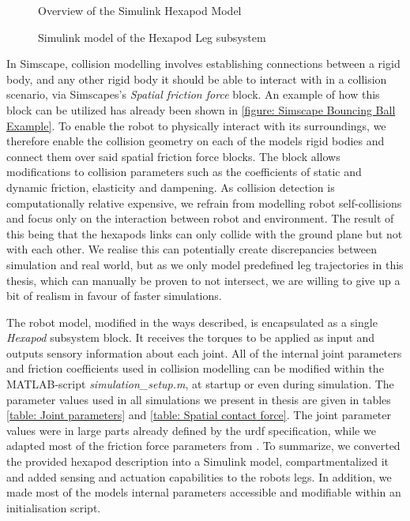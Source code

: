 \begin{figure}[h]
	\centerline{}
	\caption[Simulink hexapod model overview]{Overview of the Simulink Hexapod Model}
	\label{figure: Hexapod Model Overview}
\end{figure}

\begin{figure}
	\centerline{}
	\caption[Simulink leg subsystem]{Simulink model of the Hexapod Leg subsystem}
	\label{figure: Hexapod Leg}
\end{figure}

In Simscape, collision modelling involves establishing connections between a rigid body, and any other rigid body it should be able to interact with in a collision scenario, via Simscapes's \textit{Spatial friction force} block.
An example of how this block can be utilized has already been shown in \ref{figure: Simscape Bouncing Ball Example}.
To enable the robot to physically interact with its surroundings, we therefore  enable the collision geometry on each of the models rigid bodies and connect them over said spatial friction force blocks.
The block allows modifications to collision parameters such as the coefficients of static and dynamic friction, elasticity and dampening.
As collision detection is computationally relative expensive, we refrain from modelling robot self-collisions and focus only on the interaction between robot and environment.
The result of this being that the hexapods links can only collide with the ground plane but not with each other.
We realise this can potentially create discrepancies between simulation and real world, but as we only model predefined leg trajectories in this thesis, which can manually be proven to not intersect, we are willing to give up a bit of realism in favour of faster simulations.

The robot model, modified in the ways described, is encapsulated as a single \textit{Hexapod} subsystem block.
It receives the torques to be applied as input and outputs sensory information about each joint.
All of the internal joint parameters and friction coefficients used in collision modelling can be modified within the MATLAB-script \textit{simulation\_setup.m}, at startup or even during simulation.
The parameter values used in all simulations we present in thesis are given in tables \ref{table: Joint parameters} and \ref{table: Spatial contact force}.
The joint parameter values were in large parts already defined by the urdf specification, while we adapted most of the friction force parameters from \parencite{trotta2022walking}.
To summarize, we converted the provided hexapod description into a Simulink model, compartmentalized it and added sensing and actuation capabilities to the robots legs.
In addition, we made most of the models internal parameters accessible and modifiable within an initialisation script.




